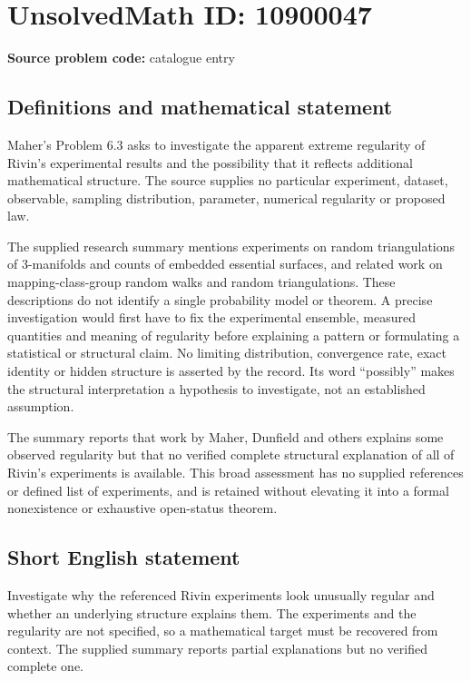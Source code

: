 \documentclass[11pt]{article}
\begin{document}
\section*{UnsolvedMath ID: 10900047}
\textbf{Source problem code:} catalogue entry
\subsection{Definitions and mathematical statement}
Maher's Problem 6.3 asks to investigate the apparent extreme regularity of Rivin's experimental results and the possibility that it reflects additional mathematical structure. The source supplies no particular experiment, dataset, observable, sampling distribution, parameter, numerical regularity or proposed law.

The supplied research summary mentions experiments on random triangulations of \(3\)-manifolds and counts of embedded essential surfaces, and related work on mapping-class-group random walks and random triangulations. These descriptions do not identify a single probability model or theorem. A precise investigation would first have to fix the experimental ensemble, measured quantities and meaning of regularity before explaining a pattern or formulating a statistical or structural claim. No limiting distribution, convergence rate, exact identity or hidden structure is asserted by the record. Its word ``possibly'' makes the structural interpretation a hypothesis to investigate, not an established assumption.

The summary reports that work by Maher, Dunfield and others explains some observed regularity but that no verified complete structural explanation of all of Rivin's experiments is available. This broad assessment has no supplied references or defined list of experiments, and is retained without elevating it into a formal nonexistence or exhaustive open-status theorem.
\subsection{Short English statement}
Investigate why the referenced Rivin experiments look unusually regular and whether an underlying structure explains them. The experiments and the regularity are not specified, so a mathematical target must be recovered from context. The supplied summary reports partial explanations but no verified complete one.
\end{document}
